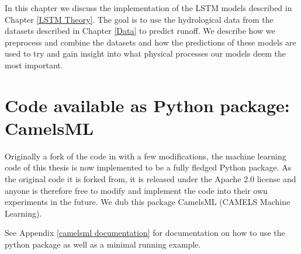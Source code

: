 In this chapter we discuss the implementation of the LSTM models described in Chapter 
\ref{LSTM Theory}. The goal is to use the hydrological data from the datasets
described in Chapter \ref{Data} to predict runoff.
We describe how we preprocess and combine the datasets 
and how the predictions of these models are used to try and gain 
insight into what physical processes our models deem the most important.
\section{Code available as Python package: CamelsML}
Originally a fork of the code in \citet{lstm_second_paper} with a few modifications, 
the machine learning code of this thesis is now implemented to be a fully fledged 
Python package. As the original code it is forked from, it is released under the 
Apache 2.0 license and anyone is therefore free to modify and implement the code 
into their own experiments in the future.
We dub this package CamelsML (CAMELS Machine Learning).


See Appendix \ref{camelsml documentation} for documentation on how to use the python 
package as well as a minimal running example.

